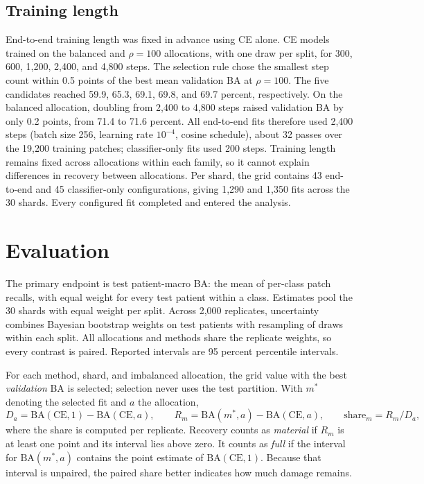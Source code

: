 \documentclass[11pt]{article}
\begin{document}
\subsection{Training length}
End-to-end training length was fixed in advance using CE alone. CE models trained on the balanced and $\rho=100$ allocations, with one draw per split, for 300, 600, 1,200, 2,400, and 4,800 steps. The selection rule chose the smallest step count within 0.5 points of the best mean validation BA at $\rho=100$. The five candidates reached 59.9, 65.3, 69.1, 69.8, and 69.7 percent, respectively. On the balanced allocation, doubling from 2,400 to 4,800 steps raised validation BA by only 0.2 points, from 71.4 to 71.6 percent. All end-to-end fits therefore used 2,400 steps (batch size 256, learning rate $10^{-4}$, cosine schedule), about 32 passes over the 19,200 training patches; classifier-only fits used 200 steps. Training length remains fixed across allocations within each family, so it cannot explain differences in recovery between allocations. Per shard, the grid contains 43 end-to-end and 45 classifier-only configurations, giving 1,290 and 1,350 fits across the 30 shards. Every configured fit completed and entered the analysis.

\section{Evaluation}
\label{sec:evaluation}
The primary endpoint is test patient-macro BA: the mean of per-class patch recalls, with equal weight for every test patient within a class. Estimates pool the 30 shards with equal weight per split. Across 2,000 replicates, uncertainty combines Bayesian bootstrap weights on test patients \citep{rubin1981bayesian} with resampling of draws within each split. All allocations and methods share the replicate weights, so every contrast is paired. Reported intervals are 95 percent percentile intervals.

For each method, shard, and imbalanced allocation, the grid value with the best \emph{validation} BA is selected; selection never uses the test partition. With $m^{*}$ denoting the selected fit and $a$ the allocation,
\begin{equation}
  D_a=\mathrm{BA}(\mathrm{CE},1)-\mathrm{BA}(\mathrm{CE},a),\qquad
  R_m=\mathrm{BA}(m^{*},a)-\mathrm{BA}(\mathrm{CE},a),\qquad
  \text{share}_m=R_m/D_a ,
  \label{eq:recovery}
\end{equation}
\noindent where the share is computed per replicate. Recovery counts as \emph{material} if $R_m$ is at least one point and its interval lies above zero. It counts as \emph{full} if the interval for $\mathrm{BA}(m^{*},a)$ contains the point estimate of $\mathrm{BA}(\mathrm{CE},1)$. Because that interval is unpaired, the paired share better indicates how much damage remains.
\end{document}
